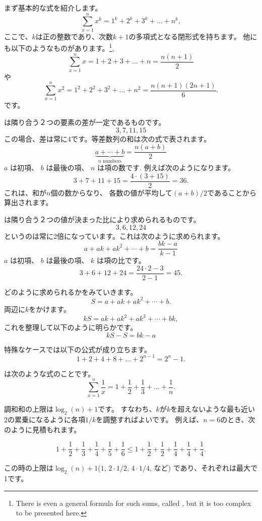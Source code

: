 まず基本的な式を紹介します。
\[\sum_{x=1}^n x^k = 1^k+2^k+3^k+\ldots+n^k,\]
ここで、$k$は正の整数であり、次数$k + 1$の多項式となる閉形式を持ちます。
他にも以下のようなものがあります。\footnote{
There is even a general formula for such sums, called ,
but it is too complex to be presented here.},
\[\sum_{x=1}^n x = 1+2+3+\ldots+n = \frac{n(n+1)}{2}\]
や
\[\sum_{x=1}^n x^2 = 1^2+2^2+3^2+\ldots+n^2 = \frac{n(n+1)(2n+1)}{6}.\]
です。


は隣り合う２つの要素の差が一定であるものです。
\[3, 7, 11, 15\]
この場合、差は常に4です。等差数列の和は次の式で表されます。
\[\underbrace{a + \cdots + b}_{n \,\, \textrm{numbers}} = \frac{n(a+b)}{2}\]
$a$ は初項、
$b$ は最後の項、
$n$ は項の数です.
例えば次のようになります。
\[3+7+11+15=\frac{4 \cdot (3+15)}{2} = 36.\]
これは、和が$n$個の数からなり、
各数の値が平均して$(a+b)/2$であることから算出されます。

は隣り合う２つの値が決まった比により求められるものです。
\[3,6,12,24\]
というのは常に2倍になっています。これは次のように求められます。
\[a + ak + ak^2 + \cdots + b = \frac{bk-a}{k-1}\]
$a$ は初項、
$b$ は最後の項、
$k$ は項の比です。
\[3+6+12+24=\frac{24 \cdot 2 - 3}{2-1} = 45.\]

どのように求められるかをみていきます。
\[ S = a + ak + ak^2 + \cdots + b .\]
両辺に$k$をかけます。
\[ kS = ak + ak^2 + ak^3 + \cdots + bk,\]
これを整理して以下のように明らかです。
\[ kS-S = bk-a\]

特殊なケースでは以下の公式が成り立ちます。
\[1+2+4+8+\ldots+2^{n-1}=2^n-1.\]


 は次のような式のことです。
\[ \sum_{x=1}^n \frac{1}{x} = 1+\frac{1}{2}+\frac{1}{3}+\ldots+\frac{1}{n}.\]

調和和の上限は$\log_2(n)+1$です。
すなわち、$k$が$k$を超えないような最も近い2の累乗になるように各項$1/k$を調整すればよいです。
例えば、$n = 6$のとき、次のように見積もれます。

\[ 1+\frac{1}{2}+\frac{1}{3}+\frac{1}{4}+\frac{1}{5}+\frac{1}{6} \le
1+\frac{1}{2}+\frac{1}{2}+\frac{1}{4}+\frac{1}{4}+\frac{1}{4}.\]

この時の上限は$\log_2(n)+1$($1$, $2 \cdot 1/2$, $4 \cdot 1/4$, など)
であり、それぞれは最大で1です。

